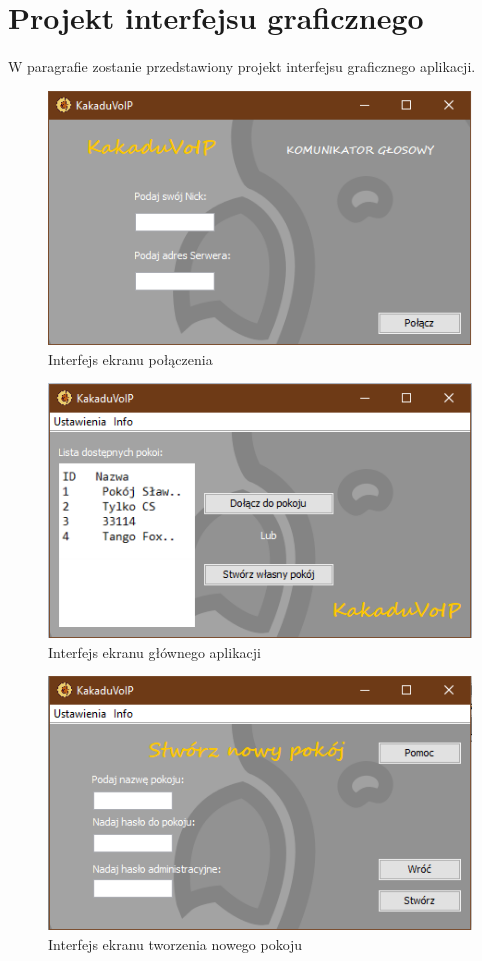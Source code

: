 \documentclass{article}
\begin{document}
	\section{Projekt interfejsu graficznego}
	\paragraph*{} W paragrafie zostanie przedstawiony projekt interfejsu graficznego aplikacji.
	\begin{figure}[H]
		\centering
		\hspace*{0cm} 
		\includegraphics[scale=0.9]{1_1.png}
		\caption[]{Interfejs ekranu połączenia}
		\label{fig:gui1}
	\end{figure}
	\begin{figure}[H]
		\centering
		\includegraphics[scale=0.9]{1_2.png}
		\caption[]{Interfejs ekranu głównego aplikacji}
		\label{fig:gui2}
	\end{figure}
	\begin{figure}[H]
		\centering
		\includegraphics[scale=0.9]{1_3.png}
		\caption[]{Interfejs ekranu tworzenia nowego pokoju}
		\label{fig:gui3}
	\end{figure}
\end{document}
